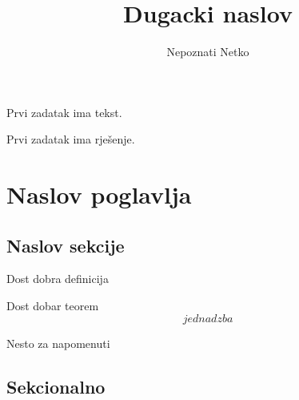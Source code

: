 \documentclass[a4paper,oneside,12pt]{memoir}
\title{Dugacki naslov}
\author{Nepoznati Netko}
\begin{document}


\makeMyTitle

\begin{exercise}
    Prvi zadatak ima tekst.
\end{exercise}

\begin{solution}
    Prvi zadatak ima rje\v senje.
\end{solution}

\chapter{Naslov poglavlja}

\section{Naslov sekcije}

\begin{definition}
    Dost dobra definicija
    \cite[Def 1.1]{kako_ce_se_pozivati_u_kodu}
\end{definition}

\begin{theorem}
    Dost dobar teorem
    \begin{equation*}
        jednadzba
    \end{equation*}
\end{theorem}

\begin{remark}
    Nesto za napomenuti
\end{remark}

\section{Sekcionalno}
\end{document}

